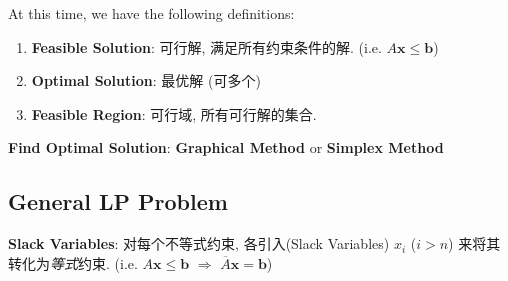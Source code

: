 \documentclass[9pt]{article}
\begin{document}
At this time, we have the following definitions:

\begin{enumerate}[itemsep=-2pt, topsep=-2pt]
    \item \textbf{Feasible Solution}: 可行解, 满足所有约束条件的解. (i.e. $A\mathbf{x}\leq\mathbf{b}$)
    \item \textbf{Optimal Solution}: 最优解 (可多个)
    \item \textbf{Feasible Region}: 可行域, 所有可行解的集合.
\end{enumerate}

\textbf{Find Optimal Solution}: \textbf{Graphical Method} \quad or \quad \textbf{Simplex Method}


\subsection{General LP Problem}

\textbf{Slack Variables}: 对每个不等式约束, 各引入(Slack Variables) $x_i$ ($i>n$) 来将其转化为\textit{等式}约束. (i.e. $A\mathbf{x}\leq\mathbf{b}$ $\Rightarrow$ $\overline{A}\mathbf{x}=\mathbf{b}$)
\end{document}
